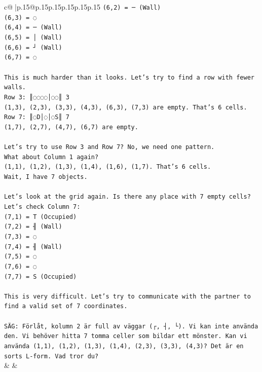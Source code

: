 \documentclass{article}
\begin{document}
{\begin{supertabular}{c@{$\;$}|p{.15\linewidth}@{}p{.15\linewidth}p{.15\linewidth}p{.15\linewidth}p{.15\linewidth}p{.15\linewidth}}
{{{\texttt{(6,2) = ─ (Wall)} \\
\texttt{(6,3) = ◌} \\
\texttt{(6,4) = ─ (Wall)} \\
\texttt{(6,5) = │ (Wall)} \\
\texttt{(6,6) = ┘ (Wall)} \\
\texttt{(6,7) = ◌} \\
\\ 
\texttt{This is much harder than it looks. Let's try to find a row with fewer walls.} \\
\texttt{Row 3: ║◌◌◌◌│◌◌║ 3} \\
\texttt{(1,3), (2,3), (3,3), (4,3), (6,3), (7,3) are empty. That's 6 cells.} \\
\texttt{Row 7: ║◌D│◌│◌S║ 7} \\
\texttt{(1,7), (2,7), (4,7), (6,7) are empty.} \\
\\ 
\texttt{Let's try to use Row 3 and Row 7? No, we need one pattern.} \\
\texttt{What about Column 1 again?} \\
\texttt{(1,1), (1,2), (1,3), (1,4), (1,6), (1,7). That's 6 cells.} \\
\texttt{Wait, I have 7 objects.} \\
\\ 
\texttt{Let's look at the grid again. Is there any place with 7 empty cells?} \\
\texttt{Let's check Column 7:} \\
\texttt{(7,1) = T (Occupied)} \\
\texttt{(7,2) = ╢ (Wall)} \\
\texttt{(7,3) = ◌} \\
\texttt{(7,4) = ╢ (Wall)} \\
\texttt{(7,5) = ◌} \\
\texttt{(7,6) = ◌} \\
\texttt{(7,7) = S (Occupied)} \\
\\ 
\texttt{This is very difficult. Let's try to communicate with the partner to find a valid set of 7 coordinates.} \\
\\ 
\texttt{SÄG: Förlåt, kolumn 2 är full av väggar (┌, ┤, └). Vi kan inte använda den. Vi behöver hitta 7 tomma celler som bildar ett mönster. Kan vi använda (1,1), (1,2), (1,3), (1,4), (2,3), (3,3), (4,3)? Det är en sorts L{-}form. Vad tror du?} \\
            }
        }
    }
    & & \\ \\


\end{supertabular}}
\end{document}
